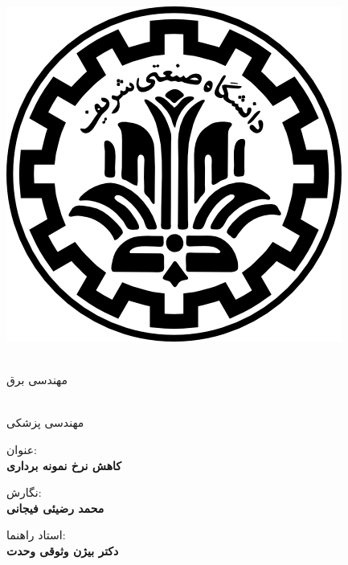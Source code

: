 
\pagestyle{empty}

\begin{center}

\includegraphics[scale=0.2]{front/template/images/logo.png}

\begin{large}

\vspace{-0.2cm}
\ThesisUniversity \\[-0.3em]
مهندسی برق

\vspace{0.5cm}

\ThesisType \\[-0.3em]
مهندسی پزشکی

\end{large}

\vspace{1cm}

{عنوان:}\\[1.2em]
{\LARGE\textbf{کاهش نرخ نمونه برداری \mri}}

\vspace{1cm}

{نگارش:}\\[.5em]
{\large\textbf{محمد رضیئی فیجانی}}

\vspace{0.7cm}

{استاد راهنما:}\\[.5em]
{\large\textbf{دکتر بیژن وثوقی وحدت}}

\vspace{1.3cm}

\ThesisDate

\end{center}

\newpage
